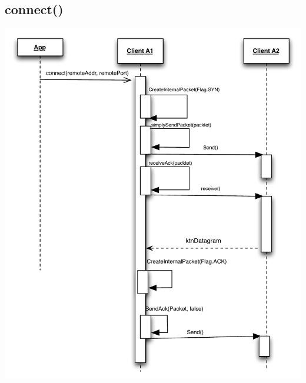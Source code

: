 \documentclass{article}
\begin{document}
\subsection{connect()}
\includegraphics[scale=0.95]{ktnConnect.pdf}
\end{document}
